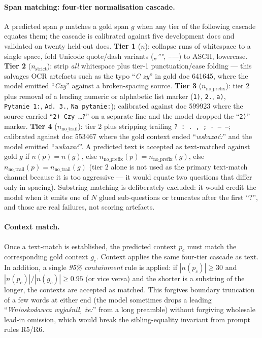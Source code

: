\paragraph{Span matching: four-tier normalisation cascade.}
A predicted span $p$ matches a gold span $g$ when any tier of the
following cascade equates them; the cascade is calibrated against
five development docs and validated on twenty held-out docs.
\textbf{Tier 1} ($n$): collapse runs of whitespace to a single space,
fold Unicode quote/dash variants (\textit{„''"}, \textit{–—}) to
ASCII, lowercase. \textbf{Tier 2} ($n_{\text{strict}}$): strip
\emph{all} whitespace plus tier-1 punctuation/case folding --- this
salvages OCR artefacts such as the typo ``\textit{C zy}'' in
gold doc 641645, where the model emitted ``\textit{Czy}'' against a
broken-spacing source. \textbf{Tier 3}
($n_{\text{no\_prefix}}$): tier 2 plus removal of a leading numeric
or alphabetic list marker (\texttt{1)}, \texttt{2.}, \texttt{a)},
\texttt{Pytanie~1:}, \texttt{Ad.~3.}, \texttt{Na pytanie:});
calibrated against doc 599923 where the source carried ``\texttt{2)
Czy~\ldots?}'' on a separate line and the model dropped the
``\texttt{2)}'' marker. \textbf{Tier 4} ($n_{\text{no\_trail}}$):
tier 2 plus stripping trailing \texttt{?\,:\,.\,,\,;\,-\,–\,—};
calibrated against doc 553467 where the gold context ended
``\textit{wskazać:}'' and the model emitted ``\textit{wskazać}''.
A predicted text is accepted as text-matched against gold $g$ if
$n(p) = n(g)$, else $n_{\text{no\_prefix}}(p) = n_{\text{no\_prefix}}(g)$,
else $n_{\text{no\_trail}}(p) = n_{\text{no\_trail}}(g)$
(tier 2 alone is not used as the primary text-match channel because it
is too aggressive --- it would equate two questions that differ only
in spacing). Substring matching is deliberately excluded: it would
credit the model when it emits one of $N$ glued sub-questions or
truncates after the first ``?'', and those are real failures, not
scoring artefacts.

\paragraph{Context match.}
Once a text-match is established, the predicted context $p_c$ must
match the corresponding gold context $g_c$. Context applies the same
four-tier cascade as text. In addition, a single \emph{95\%
containment} rule is applied: if $|n(p_c)| \geq 30$ and
$|n(p_c)|/|n(g_c)| \geq 0.95$ (or vice versa) and the shorter is a
substring of the longer, the contexts are accepted as matched. This
forgives boundary truncation of a few words at either end (the model
sometimes drops a leading ``\textit{Wnioskodawca wyjaśnił, że:}'' from
a long preamble) without forgiving wholesale lead-in omission, which
would break the sibling-equality invariant from prompt rules R5/R6.

